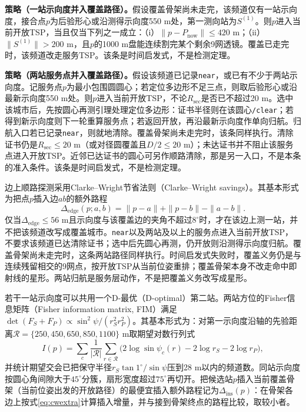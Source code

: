 \documentclass{cumcmthesis}
\begin{document}
\textbf{策略（一站示向度并入覆盖路径）。}假设覆盖骨架尚未走完，该频道仅有一站示向度，接合点$p$为后验形心或沿测得示向度550 m处，第一测向站为$S^{(1)}$。则$p$进入当前开放TSP，当且仅当下列之一成立：（i）$\|p-P_{\mathrm{now}}\|\le 420$ m；（ii）$\|S^{(1)}\|>200$ m，且$p$的1000 m盘能连续割完某个剩余9网透镜。覆盖已走完时，该频道改走服务TSP。该条是时间启发式，不是检测定理。

\textbf{策略（两站服务点并入覆盖路径）。}假设该频道已记录\texttt{near}，或已有不少于两站示向度。记服务点$p$为最小包围圆圆心；若定位多边形不足三点，则取后验形心或沿最新示向度550 m处。则$p$进入当前开放TSP，不论$R_{\mathrm{sec}}$是否已不超过20 m。选中该城市后，先按圆心再测引理处理定位多边形：证书半径则在该圆心\texttt{/clear}；若得到新示向度则下一轮重算服务点；若返回开放，再沿最新示向度作单向归航。归航入口若已记录\texttt{near}，则就地清除。覆盖骨架尚未走完时，该条同样执行。清除证书仍是$R_{\mathrm{sec}}\le 20$ m（或对径圆覆盖且$D/2\le 20$ m）；未达证书并不阻止该服务点进入开放TSP。近邻已达证书的圆心可另作顺路清除，那是另一入口，不是本条的准入条件。该条是时间启发式，不是检测定理。

边上顺路探测采用Clarke--Wright节省法则（Clarke--Wright savings）\cite{clarke1964}。其基本形式为把点$p$插入边$ab$的额外路程
\begin{equation}
\Delta_{\mathrm{edge}}(p;a,b)=\|p-a\|+\|p-b\|-\|a-b\|.
\label{eq:cwextra}
\end{equation}
仅当$\Delta_{\mathrm{edge}}\le 56$ m且示向度与该覆盖边的夹角不超过$8^\circ$时，才在该边上测一站，并不把该频道改写成覆盖城市。\texttt{near}以及两站及以上的服务点进入当前开放TSP，不要求该频道已达清除证书；选中后先圆心再测，仍开放则沿测得示向度归航。覆盖骨架尚未走完时，这条两站路径同样执行。时间启发式失败时，覆盖义务仍是与连续残留相交的9网点，按开放TSP从当前位姿重排；覆盖骨架本身不改走命中即射线的星形。两站归航是服务层动作，不是把覆盖义务改写成星形。

若干一站示向度可以共用一个D-最优（D-optimal）第二站\cite{bishop2010}。两站方位的Fisher信息矩阵（Fisher information matrix, FIM）满足$\det(F_S+F_P)\propto\sin^2\psi/(r_S^2 r_P^2)$。其基本形式为：对第一示向度沿轴的先验距离$\mathcal{R}=\{250,450,650,850,1100\}$ m取期望对数行列式
\begin{equation}
I(p)=\sum_{c}\frac{1}{|\mathcal{R}|}\sum_{r\in\mathcal{R}}\bigl(2\log\sin\psi_c(r)-2\log r_S-2\log r_P\bigr),
\label{eq:dopt}
\end{equation}
并统计期望交会已把保守半径$r_S\tan 1^\circ/\sin\psi$压到28 m以内的频道数。同站示向度按圆心角间隙大于$45^\circ$分簇，扇形宽度超过$75^\circ$再切开。把候选站$p$插入当前覆盖骨架（当前位姿出发的开放路径）的最便宜插入额外路程记为$\Delta_{\mathrm{ins}}(p)$：在骨架各边上按式\eqref{eq:cwextra}计算插入增量，并与接到骨架终点的路程比较，取较小者。
\end{document}
